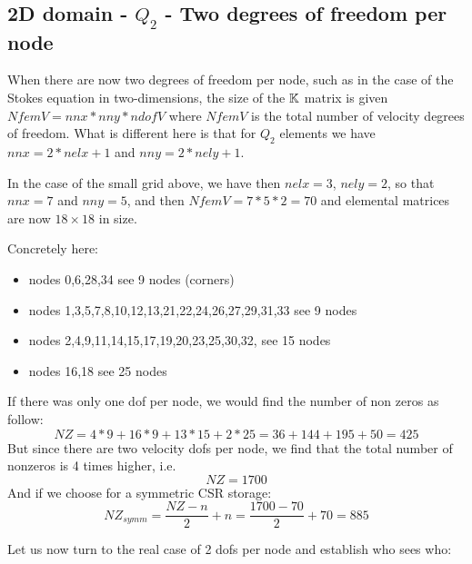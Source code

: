 \subsection{2D domain - $Q_2$ - Two degrees of freedom per node}


When there are now two degrees of freedom per node, such as in the case 
of the Stokes equation in two-dimensions, the size of the ${\mathbb{K}}$ matrix 
is given $NfemV=nnx*nny*ndofV$ where $NfemV$ is the total number of 
velocity degrees of freedom. What is different here is that for $Q_2$
elements we have $nnx=2*nelx+1$ and $nny=2*nely+1$.

\begin{center}

\end{center}

In the case of the small grid above, we have then 
$nelx=3$, $nely=2$, so that $nnx=7$ and $nny=5$, and then
$NfemV=7*5*2=70$ and elemental matrices are now $18\times18$ in size.


\begin{center}

\end{center}


Concretely here:
\begin{itemize}
\item nodes {\color{teal} 0,6,28,34} see 9 nodes (corners)
\item nodes 1,3,5,7,8,10,12,13,21,22,24,26,27,29,31,33 see 9 nodes
\item nodes 2,4,9,11,14,15,17,19,20,23,25,30,32, see 15 nodes
\item nodes 16,18 see 25 nodes
\end{itemize}

If there was only one dof per node, we would find 
the number of non zeros as follow:
\[
NZ=4*9 + 16*9 + 13*15 + 2*25 = 36+144 + 195 + 50 = 425
\]
But since there are two velocity dofs per node, we find that 
the total number of nonzeros is 4 times higher, i.e.
\[
NZ=1700
\] 
And if we choose for a symmetric CSR storage:
\[
NZ_{symm} = \frac{NZ-n}{2}+n = \frac{1700-70}{2} + 70 = 885 
\]

Let us now turn to the real case of 2 dofs per node and establish who sees who:

